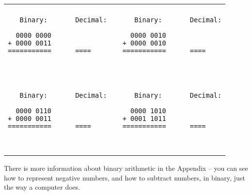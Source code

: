\begin{tabular}{p{3in} | c  p{3in} }
\hline
\\
\begin{minipage}{2.95in}
\begin{verbatim}
   Binary:       Decimal:

  0000 0000      
+ 0000 0011      
===========      ====

___________      ____
\end{verbatim}
\end{minipage}

&&

\begin{minipage}{2.95in}
\begin{verbatim}
   Binary:       Decimal:

  0000 0010      
+ 0000 0010      
===========      ====

___________      ____
\end{verbatim}
\end{minipage}

\\
\hline
\\

\begin{minipage}{2.95in}
\begin{verbatim}
   Binary:       Decimal:

  0000 0110      
+ 0000 0011      
===========      ====

___________      ____
\end{verbatim}
\end{minipage}

&&

\begin{minipage}{2.95in}
\begin{verbatim}
   Binary:       Decimal:

  0000 1010      
+ 0001 1011      
===========      ====

___________      ____
\end{verbatim}
\end{minipage}

\\
\hline
\end{tabular}

There is more information about binary arithmetic in the Appendix -- you can see how to represent negative numbers, and how to subtract numbers, in binary, just the way a computer does.

